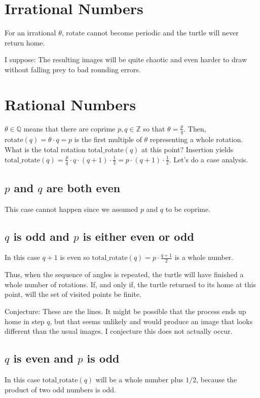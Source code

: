 \documentclass[pdftex,a4paper]{scrartcl}
\newcommand{\rotate}{\text{rotate}}
\newcommand{\total}{\text{total\_rotate}}
\begin{document}
\section{Irrational Numbers}
For an irrational \(\theta\), \(\rotate\) cannot become periodic and the turtle will never return home.

I suppose: The resulting images will be quite chaotic and even harder to draw without falling prey to bad rounding
errors.

\section{Rational Numbers}
\(\theta\in\mathbb{Q}\) means that there are coprime \(p,q\in\mathbb{Z}\) so that \(\theta=\frac{p}{q}\). Then,
\(\rotate(q)=\theta\cdot q=p\) is the first multiple of \(\theta\) representing a whole rotation. What is the total
rotation \(\total(q)\) at this point? Insertion yields \(\total(q)=\frac{p}{q}\cdot q\cdot(q+1)\cdot \frac{1}{2}
=p\cdot(q+1)\cdot\frac{1}{2}\).
Let's do a case analysis.

\subsection{$p$ and $q$ are both even}
This case cannot happen since we assumed \(p\) and \(q\) to be coprime.

\subsection{$q$ is odd and $p$ is either even or odd}
In this case \(q+1\) is even so \(\total(q)=p\cdot\frac{q+1}{2}\) is a whole number.

Thus, when the sequence of angles is repeated, the turtle will have finished a whole number of rotations. If, and only
if, the turtle returned to its home at this point, will the set of visited points be finite.

Conjecture: These are the lines. It might be possible that the process ends up home in step \(q\), but that seems
unlikely and would produce an image that looks different than the usual images. I conjecture this does not actually
occur.

\subsection{$q$ is even and $p$ is odd}
In this case \(\total(q)\) will be a whole number plus \(1/2\), because the product of two odd numbers is odd.
\end{document}
